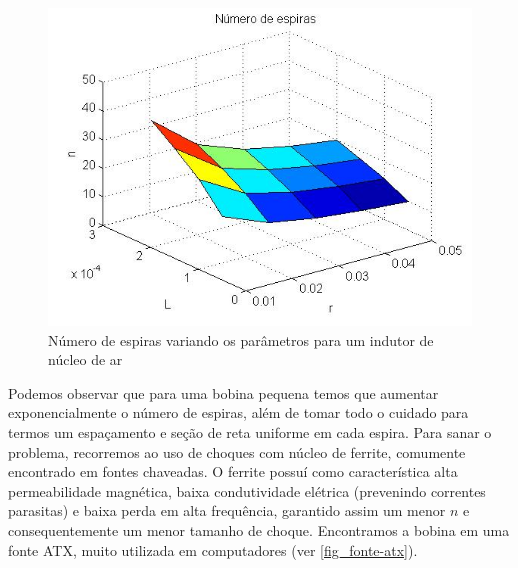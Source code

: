 \begin{figure}[htb]
\caption{\label{fig_comp-indutor}Número de espiras variando os parâmetros para um indutor de núcleo de ar}
\begin{center}
\includegraphics[scale=0.5]{images/comp-indutor.jpg}
\end{center}
\end{figure}

Podemos observar que para uma bobina pequena temos que aumentar exponencialmente o número de espiras, além de tomar todo o cuidado para termos um espaçamento e seção de reta uniforme em cada espira. Para sanar o problema, recorremos ao uso de choques com núcleo de ferrite, comumente encontrado em fontes chaveadas. O ferrite possuí como característica alta permeabilidade magnética, baixa condutividade elétrica (prevenindo correntes parasitas) e baixa perda em alta frequência, garantido assim um menor $n$ e consequentemente um menor tamanho de choque. Encontramos a bobina em uma fonte ATX, muito utilizada em computadores (ver \autoref{fig_fonte-atx}).

